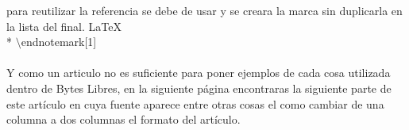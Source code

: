 para reutilizar la referencia se debe de usar \endnotemark[1] y se creara la
marca sin duplicarla en la lista del final.
\Code
   {LaTeX}
   {
   \\*
   $\setminus$endnotemark[1]
   }

\paragraph{} Y como un articulo no es suficiente para poner ejemplos de cada cosa utilizada dentro de Bytes Libres, en
la siguiente página encontraras la siguiente parte de este artículo en cuya fuente aparece entre otras cosas el como
cambiar de una columna a dos columnas el formato del artículo.

\theendnotes
\setcounter{endnote}{0}

